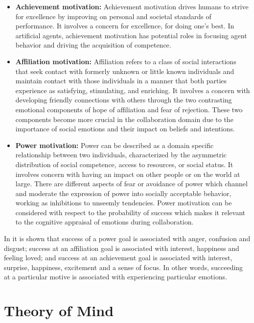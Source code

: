 \documentclass[12pt]{report}
\begin{document}
\begin{itemize}
  \item \textbf{Achievement motivation:}
  Achievement motivation drives humans to strive for excellence by improving on
  personal and societal standards of performance. It involves a concern for
  excellence, for doing one's best. In artificial agents, achievement
  motivation has potential roles in focusing agent behavior and driving the
  acquisition of competence.
  
  \item \textbf{Affiliation motivation:}
  Affiliation refers to a class of social interactions that seek contact with
  formerly unknown or little known individuals and maintain contact with those
  individuals in a manner that both parties experience as satisfying,
  stimulating, and enriching. It involves a concern with developing friendly
  connections with others through the two contrasting emotional components of
  hope of affiliation and fear of rejection. These two components become more
  crucial in the collaboration domain due to the importance of social emotions
  and their impact on beliefs and intentions.
  
  \item \textbf{Power motivation:}
  Power can be described as a domain specific relationship between two
  individuals, characterized by the asymmetric distribution of social
  competence, access to resources, or social status. It involves concern with
  having an impact on other people or on the world at large. There are different
  aspects of fear or avoidance of power which channel and moderate the
  expression of power into socially acceptable behavior, working as inhibitions
  to unseemly tendencies. Power motivation can be considered with respect to the
  probability of success which makes it relevant to the cognitive appraisal of
  emotions during collaboration.
\end{itemize}

In \cite{zurbriggen:linking-motives-emotions} it is shown that success of a
power goal is associated with anger, confusion and disgust; success at an
affiliation goal is associated with interest, happiness and feeling loved; and
success at an achievement goal is associated with interest, surprise, happiness,
excitement and a sense of focus. In other words, succeeding at a particular
motive is associated with experiencing particular emotions.

\section{Theory of Mind}
\label{section-tom-bg}
\end{document}
